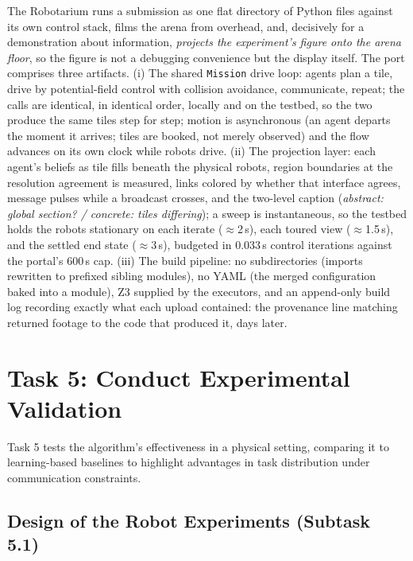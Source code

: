 \documentclass[10pt]{article}
\theoremstyle{definition}
\theoremstyle{remark}
\begin{document}
The Robotarium runs a submission as one flat directory of Python files against its own control stack, films the arena from overhead, and, decisively for a demonstration about information, \emph{projects the experiment's figure onto the arena floor}, so the figure is not a debugging convenience but the display itself. The port comprises three artifacts. (i) The shared \texttt{Mission} drive loop: agents plan a tile, drive by potential-field control with collision avoidance, communicate, repeat; the calls are identical, in identical order, locally and on the testbed, so the two produce the same tiles step for step; motion is asynchronous (an agent departs the moment it arrives; tiles are booked, not merely observed) and the flow advances on its own clock while robots drive. (ii) The projection layer: each agent's beliefs as tile fills beneath the physical robots, region boundaries at the resolution agreement is measured, links colored by whether that interface agrees, message pulses while a broadcast crosses, and the two-level caption (\emph{abstract: global section? / concrete: tiles differing}); a sweep is instantaneous, so the testbed holds the robots stationary on each iterate ($\approx$2\,s), each toured view ($\approx$1.5\,s), and the settled end state ($\approx$3\,s), budgeted in 0.033\,s control iterations against the portal's 600\,s cap. (iii) The build pipeline: no subdirectories (imports rewritten to prefixed sibling modules), no YAML (the merged configuration baked into a module), Z3 supplied by the executors, and an append-only build log recording exactly what each upload contained: the provenance line matching returned footage to the code that produced it, days later.

\section{Task 5: Conduct Experimental Validation}
\label{sec:task5}

Task 5 tests the algorithm's effectiveness in a physical setting, comparing it to learning-based baselines to highlight advantages in task distribution under communication constraints.

\subsection{Design of the Robot Experiments (Subtask 5.1)}
\label{sec:task51}
\end{document}
